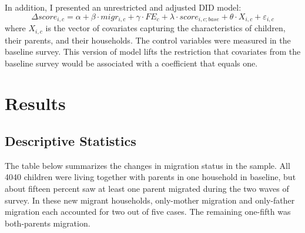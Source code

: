 \documentclass[
  man,floatsintext]{apa7}
\begin{document}
In addition, I presented an unrestricted and adjusted DID model: \[\Delta score_{i,c} = \alpha + \beta \cdot migr_{i,c} + \gamma \cdot FE_{c} + \lambda \cdot score_{i,c;base} + \theta \cdot X_{i,c} + \varepsilon_{i,c}\] where \(X_{i,c}\) is the vector of covariates capturing the characteristics of children, their parents, and their households. The control variables were measured in the baseline survey. This version of model lifts the restriction that covariates from the baseline survey would be associated with a coefficient that equals one.

\newpage

\hypertarget{results}{%
\section{Results}\label{results}}

\hypertarget{descriptive-statistics}{%
\subsection{Descriptive Statistics}\label{descriptive-statistics}}

The table below summarizes the changes in migration status in the sample. All 4040 children were living together with parents in one household in baseline, but about fifteen percent saw at least one parent migrated during the two waves of survey. In these new migrant households, only-mother migration and only-father migration each accounted for two out of five cases. The remaining one-fifth was both-parents migration.
\end{document}
